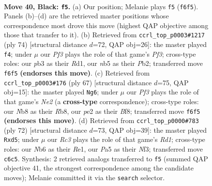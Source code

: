 \documentclass[11pt]{article}
\begin{document}
\clearpage

\begin{figure}[p]\centering
\begin{subfigure}{0.46\textwidth}\centering
\resizebox{\linewidth}{!}{%
\newchessgame
\chessboard[
  setfen={1nb5/1p6/1nr2pk1/pN1p2p1/1b4Pp/1P2P2P/PB2PK2/2RB4 b - - 15 40},
  showmover=false,
  pgfstyle=straightmove, color=movearrow, markmove={f6-f5}
]}
\caption{}
\end{subfigure}\hfill
\begin{subfigure}{0.46\textwidth}\centering
\resizebox{\linewidth}{!}{%
\newchessgame
\chessboard[
  setfen={1r6/5p2/1pnkb2p/3p1BpP/p2P2P1/P3NPK1/1P6/3R4 w - - 0 38},
  showmover=false,
  pgfstyle=straightmove, color=movearrow, markmove={f3-f4}
]}
\caption{}
\end{subfigure}
\\[4pt]
\begin{subfigure}{0.46\textwidth}\centering
\resizebox{\linewidth}{!}{%
\newchessgame
\chessboard[
  setfen={1r3bk1/1pNRnp2/7p/2p3p1/p1b2PP1/P3P2P/1P4BK/2B5 b - - 1 34},
  showmover=false,
  pgfstyle=straightmove, color=movearrow, markmove={e7-g6}
]}
\caption{}
\end{subfigure}\hfill
\begin{subfigure}{0.46\textwidth}\centering
\resizebox{\linewidth}{!}{%
\newchessgame
\chessboard[
  setfen={2r1k3/4p1b1/p3Ppp1/P2r3p/1Bb4P/2P2NP1/5P1K/3RR3 w - - 5 37},
  showmover=false,
  pgfstyle=straightmove, color=movearrow, markmove={d1-d5}
]}
\caption{}
\end{subfigure}
\caption{\textbf{Move 40, Black: \texttt{f5}.} (a) Our position; Melanie plays \texttt{f5} (\texttt{f6f5}). Panels (b)--(d) are the retrieved master positions whose correspondence most drove this move (highest QAP objective among those that transfer to it). (b) Retrieved from \texttt{ccrl\_top\_p0003\#1217} (ply 74) [structural distance $d$=72, QAP obj=26]: the master played \texttt{f4}; under $\mu$ our \emph{Pf3} plays the role of that game's \emph{Pf3}; cross-type roles: our \emph{p}b3 as their \emph{R}d1, our \emph{n}b5 as their \emph{P}b2; transferred move \texttt{f6f5} \textbf{(endorses this move)}. (c) Retrieved from \texttt{ccrl\_top\_p0003\#176} (ply 67) [structural distance $d$=75, QAP obj=15]: the master played \texttt{Ng6}; under $\mu$ our \emph{Pf3} plays the role of that game's \emph{Ne2} (a \textbf{cross-type} correspondence); cross-type roles: our \emph{N}b8 as their \emph{R}b8, our \emph{p}e2 as their \emph{B}f8; transferred move \texttt{f6f5} \textbf{(endorses this move)}. (d) Retrieved from \texttt{ccrl\_top\_p0000\#783} (ply 72) [structural distance $d$=73, QAP obj=39]: the master played \texttt{Rxd5}; under $\mu$ our \emph{Rc3} plays the role of that game's \emph{Rd1}; cross-type roles: our \emph{N}b6 as their \emph{R}e1, our \emph{P}a5 as their \emph{N}f3; transferred move \texttt{c6c5}. Synthesis: 2 retrieved analogs transferred to \texttt{f5} (summed QAP objective 41, the strongest correspondence among the candidate moves); Melanie committed it via the \texttt{search} selector.}
\label{fig:thought-m79}
\end{figure}
\end{document}
